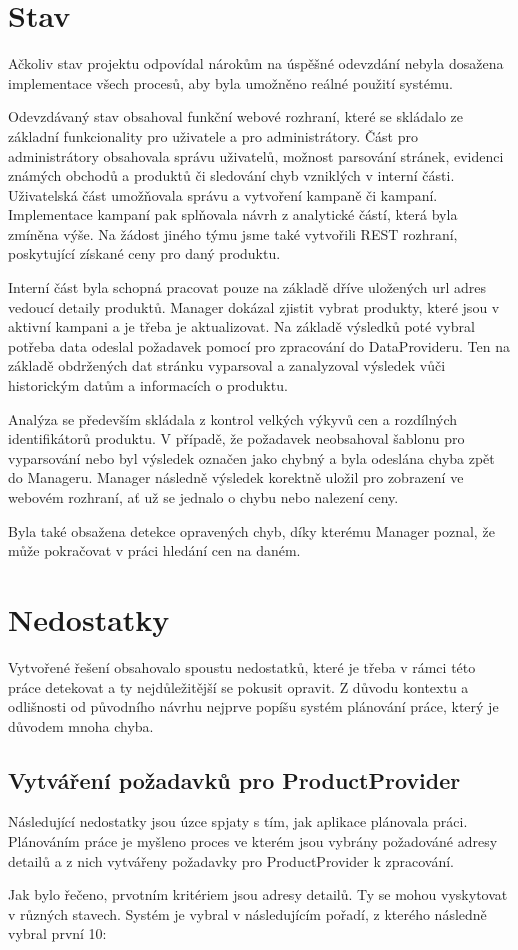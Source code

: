 \documentclass[thesis=B,czech]{FITthesis}[2012/06/26]
\begin{document}
\section{Stav}
Ačkoliv stav projektu odpovídal nárokům na úspěšné odevzdání nebyla dosažena implementace všech procesů, aby byla umožněno reálné
použití systému.
\par
Odevzdávaný stav obsahoval funkční webové rozhraní, které se skládalo ze základní funkcionality pro uživatele a pro administrátory.
Část pro administrátory obsahovala správu uživatelů, možnost parsování stránek, evidenci známých obchodů a produktů či sledování
chyb vzniklých v interní části.
Uživatelská část umožňovala správu a vytvoření kampaně či kampaní. Implementace kampaní pak splňovala návrh z analytické částí,
která byla zmíněna výše.
Na žádost jiného týmu jsme také vytvořili REST rozhraní, poskytující získané ceny pro daný produktu.
\par
Interní část byla schopná pracovat pouze na základě dříve uložených url adres vedoucí detaily produktů. 
Manager dokázal zjistit vybrat produkty, které jsou v aktivní kampani a je třeba je aktualizovat.
Na základě výsledků poté vybral potřeba data odeslal požadavek pomocí pro zpracování do DataProvideru. Ten na základě obdržených dat stránku vyparsoval a zanalyzoval výsledek vůči historickým datům a informacích o produktu. 
\par
Analýza se především skládala z kontrol velkých výkyvů cen a rozdílných identifikátorů produktu.
V případě, že požadavek neobsahoval šablonu pro vyparsování nebo byl výsledek označen jako chybný a byla odeslána chyba
zpět do Manageru. Manager následně výsledek korektně uložil pro zobrazení ve webovém rozhraní, ať už se jednalo o chybu
nebo nalezení ceny.
\par
Byla také obsažena detekce opravených chyb, díky kterému Manager poznal, že může pokračovat v práci hledání cen na daném.

\section{Nedostatky}
Vytvořené řešení obsahovalo spoustu nedostatků, které je třeba v rámci této práce detekovat a ty nejdůležitější se pokusit opravit.
Z důvodu kontextu a odlišnosti od původního návrhu nejprve popíšu systém plánování práce, který je důvodem mnoha chyba.

\subsection{Vytváření požadavků pro ProductProvider}
Následující nedostatky jsou úzce spjaty s tím, jak aplikace plánovala práci. Plánováním práce je myšleno proces ve kterém 
jsou vybrány požadováné adresy detailů a z nich vytvářeny požadavky pro ProductProvider k zpracování. 
\par
Jak bylo řečeno, prvotním kritériem jsou adresy detailů. Ty se mohou vyskytovat v různých stavech. Systém je vybral v 
následujícím pořadí, z kterého následně vybral první 10:
\end{document}
